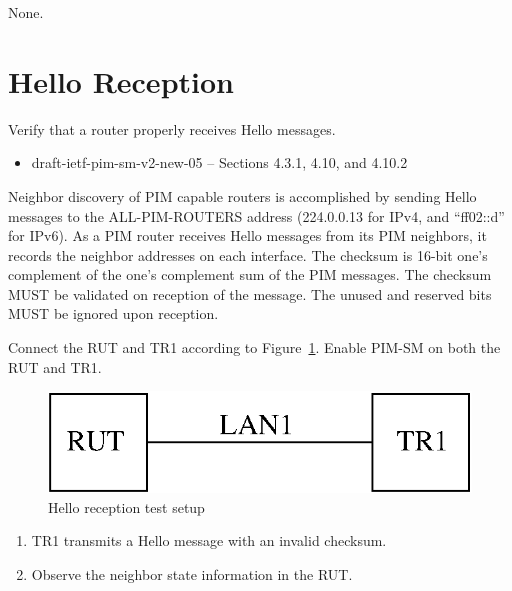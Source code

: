 \documentclass[11pt]{report}
\begin{document}
None.

\newpage
\section{Hello Reception}

Verify that a router properly receives Hello messages.

\begin{itemize}
  \item draft-ietf-pim-sm-v2-new-05 -- Sections 4.3.1, 4.10, and 4.10.2
\end{itemize}

Neighbor discovery of PIM capable routers is accomplished by sending Hello
messages to the ALL-PIM-ROUTERS address (224.0.0.13 for IPv4,
and ``ff02::d'' for IPv6). As a PIM router receives Hello messages from its
PIM neighbors, it records the neighbor addresses on each interface.
The checksum is 16-bit one's complement of the one's complement sum of the PIM
messages. The checksum MUST be validated on reception of the message.
The unused and reserved bits MUST be ignored upon reception.

Connect the RUT and TR1 according to Figure~\ref{fig:pim_test_2_3_hello_reception}.
Enable PIM-SM on both the RUT and TR1.

\begin{figure}[htbp]
  \begin{center}
    \includegraphics[scale=0.8]{figs/pim_test_2_3_hello_reception}
    \caption{Hello reception test setup}
    \label{fig:pim_test_2_3_hello_reception}
  \end{center}
\end{figure}



\begin{enumerate}

  \item TR1 transmits a Hello message with an invalid checksum.

  \item Observe the neighbor state information in the RUT.

\end{enumerate}
\end{document}
